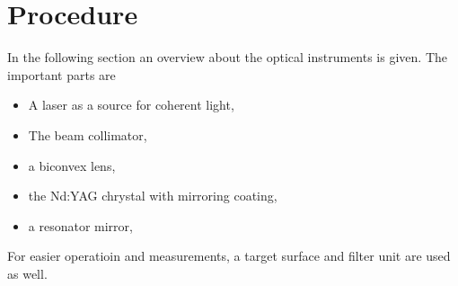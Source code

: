 \section{Procedure}
\label{sec:procedure}
In the following section an overview about the optical instruments is given. The important parts are
\begin{itemize}
  \item A laser as a source for coherent light,
  \item The beam collimator,
  \item a biconvex lens,
  \item the Nd:YAG chrystal with mirroring coating,
  \item a resonator mirror,
\end{itemize}
For easier operatioin and measurements, a target surface and filter unit are used as well.

